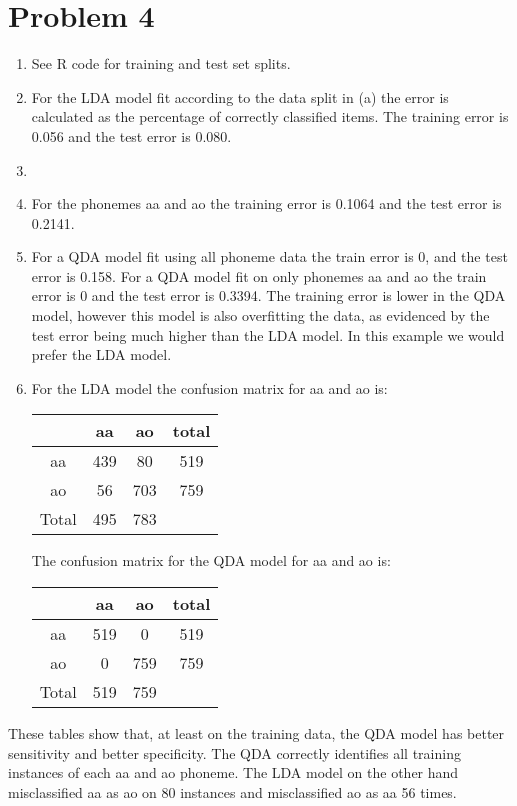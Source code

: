 \section*{Problem 4}
\begin{enumerate}
\item See R code for training and test set splits.
\item For the LDA model fit according to the data split in (a) the error is calculated as the percentage of correctly classified items. The training error is 0.056 and the test error is 0.080.
\item 
\item For the phonemes aa and ao the training error is 0.1064 and the test error is 0.2141.
\item For a QDA model fit using all phoneme data the train error is 0, and the test error is 0.158. For a QDA model fit on only phonemes aa and ao the train error is 0 and the test error is 0.3394. The training error is lower in the QDA model, however this model is also overfitting the data, as evidenced by the test error being much higher than the LDA model. In this example we would prefer the LDA model.
\item For the LDA model the confusion matrix for aa and ao is:
\begin{center}
\begin{tabular}{c|c|c|c}
\hline
& aa & ao & total\\
\hline
aa & 439 & 80 &  519 \\
ao & 56 & 703 & 759 \\
\hline
Total & 495 & 783 &  
\end{tabular}
\end{center}
The confusion matrix for the QDA model for aa and ao is:
\begin{center}
\begin{tabular}{c|c|c|c}
\hline
& aa & ao & total\\
\hline
aa & 519 & 0 &  519 \\
ao & 0 & 759 & 759 \\
\hline
Total & 519 & 759 &  
\end{tabular}
\end{center}
\end{enumerate}
These tables show that, at least on the training data, the QDA model has better sensitivity and better specificity. The QDA correctly identifies all training instances of each aa and ao phoneme. The LDA model on the other hand misclassified aa as ao on 80 instances and misclassified ao as aa 56 times. 
